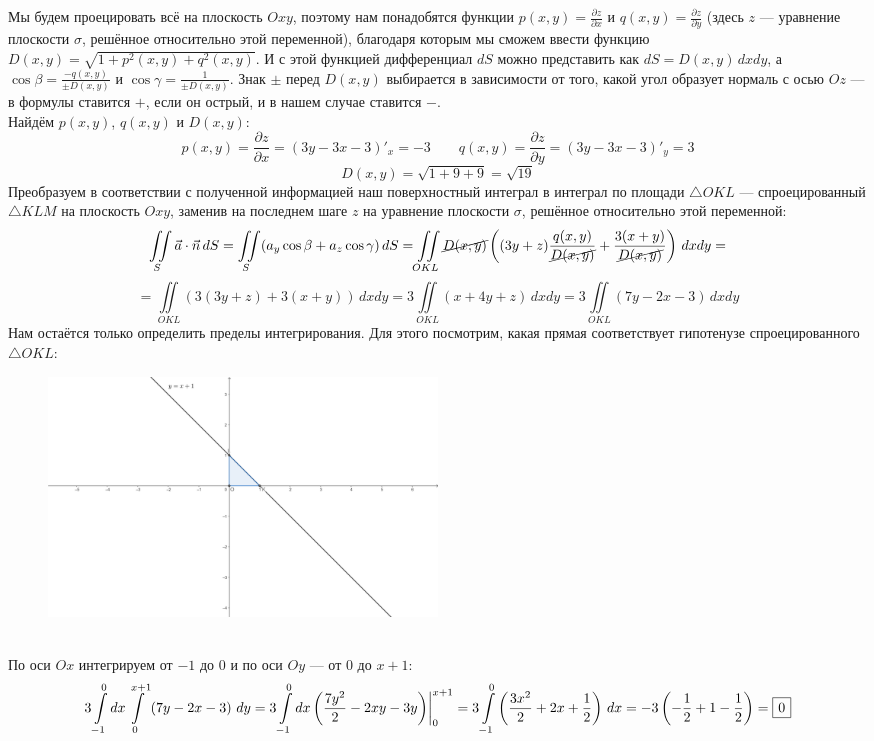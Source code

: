\documentclass[a3paper,14pt]{extarticle}
\newcommand*\squared[1]{\tikz[baseline=(char.base)]{
            \node[shape=rectangle,draw,inner sep=4pt] (char) {#1};}}
\newcommand{\at}{\biggr\rvert}
\begin{document}
Мы будем проецировать всё на плоскость $Oxy$, поэтому нам понадобятся функции $p(x,y) = \frac{\partial z}{\partial x}$ и $q(x,y) = \frac{\partial z}{\partial y}$ (здесь $z$ --- уравнение плоскости $\sigma$, решённое относительно этой переменной), благодаря которым мы сможем ввести функцию $D(x,y) = \sqrt{1+p^2(x,y)+q^2(x,y)}$. И с этой функцией дифференциал $dS$ можно представить как $dS = D(x,y)\,dxdy$, а $\cos{\beta} = \frac{-q(x,y)}{\pm D(x,y)}$ и $\cos{\gamma} = \frac{1}{\pm D(x,y)}$. Знак $\pm$ перед $D(x,y)$ выбирается в зависимости от того, какой угол образует нормаль с осью $Oz$ --- в формулы ставится $+$, если он острый, и в нашем случае ставится $-$.\\[1em]
Найдём $p(x,y)$, $q(x,y)$ и $D(x,y)$:
$$p(x,y) = \frac{\partial z}{\partial x} = (3y-3x-3)'_x = -3\qquad q(x,y) = \frac{\partial z}{\partial y} = (3y-3x-3)'_y = 3$$
$$D(x, y) = \sqrt{1+9+9} = \sqrt{19}$$
Преобразуем в соответствии с полученной информацией наш поверхностный интеграл в интеграл по площади $\triangle OKL$ --- спроецированный $\triangle KLM$ на плоскость $Oxy$, заменив на последнем шаге $z$ на уравнение плоскости $\sigma$, решённое относительно этой переменной: $$\iint\limits_S\vec{a}\cdot\vec{n}\,dS = \iint\limits_S (a_y\cos{\beta} + a_z\cos{\gamma})\,dS = \iint\limits_{OKL} \cancel{D(x,y)}\left( (3y + z)\frac{q(x,y)}{\cancel{D(x,y)}} + \frac{3(x + y)}{\cancel{D(x,y)}} \right)\,dxdy = $$
$$= \iint\limits_{OKL} \left( 3(3y + z) + 3(x + y) \right)\,dxdy = 3\iint\limits_{OKL} \left(x + 4y + z \right)\,dxdy = 3\iint\limits_{OKL} \left( 7y - 2x - 3 \right)\,dxdy$$
Нам остаётся только определить пределы интегрирования. Для этого посмотрим, какая прямая соответствует гипотенузе спроецированного $\triangle OKL$:
\begin{figure}[h]
    \centering\includegraphics[width=0.5\textwidth]{5.1 triangle.png}
\end{figure} \,\\[1em]
По оси $Ox$ интегрируем от $-1$ до $0$ и по оси $Oy$ --- от $0$ до $x+1$:
$$3\int\limits_{-1}^0 dx \int\limits_0^{x+1} \left( 7y - 2x - 3 \right)\,dy = 3\int\limits_{-1}^0 dx\left( \frac{7y^2}{2} - 2xy - 3y \right)\at_0^{x+1} = 3\int\limits_{-1}^0 \left( \frac{3x^2}{2}+2x+\frac{1}{2} \right)\,dx = -3\left( -\frac{1}{2}+1-\frac{1}{2} \right) = \squared{$0$}$$\\[2em]
\end{document}
